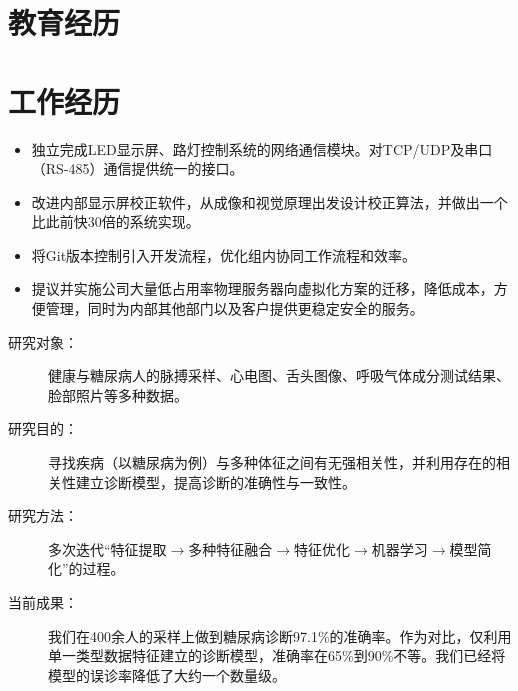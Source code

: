 \documentclass[10pt,a4paper]{moderncv/moderncv}
\begin{document}
\maketitle


\section{教育经历}


\section{工作经历}
{
\begin{itemize}
	\item 独立完成LED显示屏、路灯控制系统的网络通信模块。对TCP/UDP及串口（RS-485）通信提供统一的接口。
	\item 改进内部显示屏校正软件，从成像和视觉原理出发设计校正算法，并做出一个比此前快30倍的系统实现。
	\item 将Git版本控制引入开发流程，优化组内协同工作流程和效率。
	\item 提议并实施公司大量低占用率物理服务器向虚拟化方案的迁移，降低成本，方便管理，同时为内部其他部门以及客户提供更稳定安全的服务。
\end{itemize}
}

{
\begin{description}
	\item[研究对象：] 健康与糖尿病人的脉搏采样、心电图、舌头图像、呼吸气体成分测试结果、脸部照片等多种数据。
	\item[研究目的：] 寻找疾病（以糖尿病为例）与多种体征之间有无强相关性，并利用存在的相关性建立诊断模型，提高诊断的准确性与一致性。
	\item[研究方法：] 多次迭代``特征提取$\rightarrow$多种特征融合$\rightarrow$特征优化$\rightarrow$机器学习$\rightarrow$模型简化''的过程。
	\item[当前成果：] 我们在400余人的采样上做到糖尿病诊断97.1\%的准确率。作为对比，仅利用单一类型数据特征建立的诊断模型，准确率在65\%到90\%不等。我们已经将模型的误诊率降低了大约一个数量级。
\end{description}
}
\end{document}
